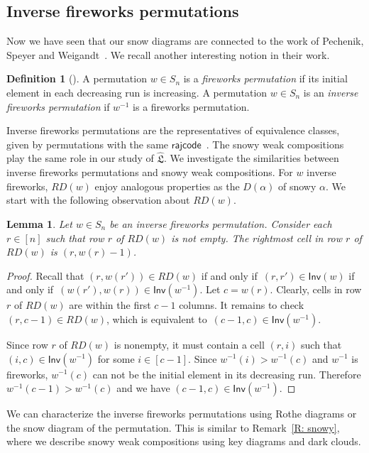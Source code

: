 \documentclass[10pt]{amsart}
\theoremstyle{plain}
\theoremstyle{plain}
\theoremstyle{definition}
\theoremstyle{definition}
\newtheorem{defn}[defn]{Definition}
\theoremstyle{definition}
\theoremstyle{plain}
\theoremstyle{plain}
\theoremstyle{plain}
\newtheorem{lemma}[lemma]{Lemma}
\theoremstyle{plain}
\theoremstyle{plain}
\theoremstyle{remark}
\theoremstyle{remark}
\theoremstyle{plain}
\theoremstyle{plain}
\newcommand{\fL}{\mathfrak{L}}
\newcommand{\topLas}{\widehat{\fL}}
\newcommand{\rajcode}{\mathsf{rajcode}}
\newcommand{\Inv}{\mathsf{Inv}}
\newcommand{\definition}[1]{{\color{darkred}\emph{#1}}}
\begin{document}
\subsection{Inverse fireworks permutations}\label{subsec.inverse.fireworks}
Now we have seen that our snow diagrams 
are connected to the work of Pechenik, Speyer and Weigandt~\cite{PSW}.
We recall another interesting notion in their work.

\begin{defn}[{\cite[Definition 3.5]{PSW}}]
A permutation $w \in S_n$ is a 
\definition{fireworks permutation}
if its initial element in each decreasing run
is increasing. 
A permutation $w \in S_n$ is an 
\definition{inverse fireworks permutation}
if $w^{-1}$ is a fireworks permutation.
\end{defn}

Inverse fireworks permutations
are the representatives of equivalence classes,
given by permutations with the same $\rajcode$~\cite{PSW}.
The snowy weak compositions play the same role
in our study of $\topLas$.
We investigate the similarities between inverse fireworks permutations
and snowy weak compositions. 
For $w$ inverse fireworks, $RD(w)$ enjoy analogous properties as the $D(\alpha)$ of snowy $\alpha$. 
We start with the following 
observation about $RD(w)$.

\begin{lemma}\label{L: inv fire perm diagram}
Let $w \in S_n$ be an inverse fireworks permutation.
Consider each $r \in [n]$ such that 
row $r$ of $RD(w)$ is not empty. 
The rightmost cell in row $r$ of $RD(w)$
is $(r, w(r) - 1)$.
\end{lemma}
\begin{proof}
Recall that $(r, w(r')) \in RD(w)$ 
if and only if~$(r, r') \in \Inv(w)$
if and only if~$(w(r'), w(r)) 
\in \Inv(w^{-1})$.
Let $c = w(r)$.
Clearly, cells in row $r$
of $RD(w)$ are within the first $c - 1$
columns.
It remains to check $(r, c-1) \in RD(w)$,
which is equivalent to~$(c -1, c) \in \Inv(w^{-1})$.

Since row $r$ of $RD(w)$ is nonempty, 
it must contain a cell $(r,i)$ such that $(i,c)\in \Inv(w^{-1})$ 
for some $i \in [c-1]$. Since $w^{-1}(i)>w^{-1}(c)$ and $w^{-1}$ is 
fireworks, $w^{-1}(c)$ can not be the initial element in its 
decreasing run. Therefore $w^{-1}(c-1) > w^{-1}(c)$ and 
we have $(c-1, c) \in \Inv(w^{-1})$.
\end{proof}


We can characterize the inverse fireworks permutations
using Rothe diagrams or the snow diagram of the permutation. This 
is similar to Remark~\ref{R: snowy},
where we describe snowy weak compositions using key diagrams and 
dark clouds.
\end{document}
